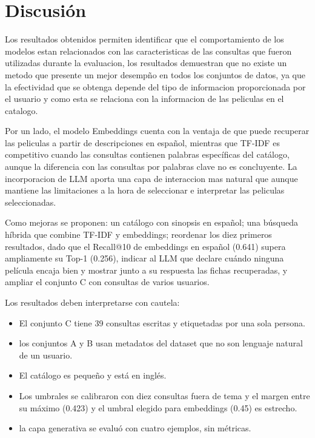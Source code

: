 ﻿\section{Discusión}\label{sec:discusion}

Los resultados obtenidos permiten identificar que el comportamiento de los modelos estan relacionados con las caracteristicas de las consultas que fueron utilizadas durante la evaluacion, los resultados demuestran que no existe un metodo que presente un mejor desempño en todos los conjuntos de datos, ya que la efectividad que se obtenga depende del tipo de informacion proporcionada por el usuario y como esta se relaciona con la informacion de las peliculas en el catalogo. 

Por un lado, el modelo Embeddings cuenta con la ventaja de que puede recuperar las peliculas a partir de descripciones en español, mientras que TF-IDF es competitivo cuando las consultas contienen palabras específicas del catálogo, aunque la diferencia con las consultas por palabras clave no es concluyente. La incorporacion de LLM aporta una capa de interaccion mas natural que aunque mantiene las limitaciones a la hora de seleccionar e interpretar las peliculas seleccionadas.

Como mejoras se proponen: un catálogo con sinopsis en español; una búsqueda híbrida que combine TF-IDF y embeddings; reordenar los diez primeros resultados, dado que el Recall@10 de embeddings en español (0.641) supera ampliamente su Top-1 (0.256), indicar al LLM que declare cuándo ninguna película encaja bien y mostrar junto a su respuesta las fichas recuperadas, y ampliar el conjunto C con consultas de varios usuarios.

Los resultados deben interpretarse con cautela: 

\begin{itemize}
    \item El conjunto C tiene 39 consultas escritas y etiquetadas por una sola persona.
    \item los conjuntos A y B usan metadatos del dataset que no son lenguaje natural de un usuario.
    \item El catálogo es pequeño y está en inglés.
    \item Los umbrales se calibraron con diez consultas fuera de tema y el margen entre su máximo (0.423) y el umbral elegido para embeddings (0.45) es estrecho.
    \item la capa generativa se evaluó con cuatro ejemplos, sin métricas.

\end{itemize}